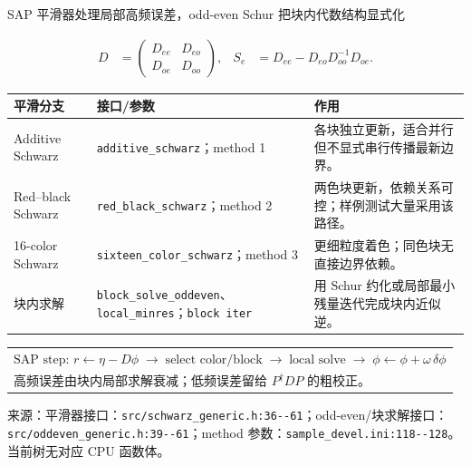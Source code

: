\documentclass[UTF8,aspectratio=169,11pt]{ctexbeamer}
\newcommand{\source}[1]{%
  \vspace{0.06em}\par{\raggedright\scriptsize\color{muted}来源：#1\par}}
\newcommand{\code}[1]{\nolinkurl{#1}}
\newcommand{\compactframe}{%
  \small
  \setlength{\tabcolsep}{3pt}%
  \renewcommand{\arraystretch}{0.86}%
}
\begin{document}
\begin{frame}[t]{SAP 平滑器处理局部高频误差，odd-even Schur 把块内代数结构显式化}
  \compactframe
  \begin{align*}
    D&=\begin{pmatrix}D_{ee}&D_{eo}\\D_{oe}&D_{oo}\end{pmatrix},
    &S_e&=D_{ee}-D_{eo}D_{oo}^{-1}D_{oe}.
  \end{align*}
  \begin{tabularx}{0.96\textwidth}{@{}p{}p{}Y@{}}
    \toprule
    平滑分支 & 接口/参数 & 作用 \\
    \midrule
    Additive Schwarz & \code{additive_schwarz}；method 1 & 各块独立更新，适合并行但不显式串行传播最新边界。 \\
    Red--black Schwarz & \code{red_black_schwarz}；method 2 & 两色块更新，依赖关系可控；样例测试大量采用该路径。 \\
    16-color Schwarz & \code{sixteen_color_schwarz}；method 3 & 更细粒度着色；同色块无直接边界依赖。 \\
    块内求解 & \code{block_solve_oddeven}、\code{local_minres}；\code{block iter} & 用 Schur 约化或局部最小残量迭代完成块内近似逆。 \\
    \bottomrule
  \end{tabularx}
  \vspace{0.1cm}
  \begin{tabular}{@{}l@{}}
    $\text{SAP step: }r\gets\eta-D\phi\;\longrightarrow\;\text{select color/block}\;\longrightarrow\;\text{local solve}\;\longrightarrow\;\phi\gets\phi+\omega\,\delta\phi$ \\
    \quad 高频误差由块内局部求解衰减；低频误差留给 $P^\dagger D P$ 的粗校正。
  \end{tabular}
  \source{平滑器接口：\code{src/schwarz_generic.h:36--61}；odd-even/块求解接口：\code{src/oddeven_generic.h:39--61}；method 参数：\code{sample_devel.ini:118--128}。当前树无对应 CPU 函数体。}
\end{frame}
\end{document}
